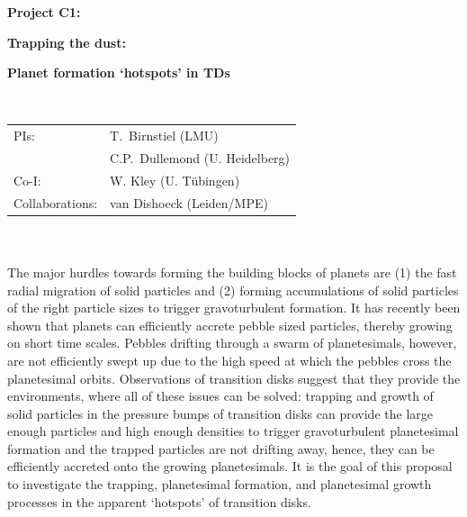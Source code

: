 \documentclass[10pt,fleqn,twoside]{article}
\begin{document}
\newpage


\setcounter{page}{1}

\centerline{\huge\bf\Tcol
%
%
%
%
%
 Project C1:}
\vspace{1em}

\centerline{\LARGE\bf\Tcol Trapping the dust:}\vspace{0.3em}
\centerline{\LARGE\bf\Tcol  Planet formation `hotspots' in TDs}

%
%
%
%
%
\vskip1.0cm


\\
\begin{tabular}{ll}
{\textsf{PIs:}}            & T.~Birnstiel (LMU) \\
                           & C.P.~Dullemond (U. Heidelberg)\\
{\textsf{Co-I:}}           & W. Kley (U. Tübingen) \\
{\textsf{Collaborations:}} & van Dishoeck (Leiden/MPE) \\

\end{tabular}


\vspace{1em}
 \\

\vspace{1em}
\\
The major hurdles towards forming the building blocks of planets are
(1) the fast radial migration of solid particles and (2) forming
accumulations of solid particles of the right particle sizes to
trigger gravoturbulent formation. It has recently been shown that
planets can efficiently accrete pebble sized particles, thereby
growing on short time scales. Pebbles drifting through a swarm of
planetesimals, however, are not efficiently swept up due to the high
speed at which the pebbles cross the planetesimal orbits. Observations
of transition disks suggest that they provide the environments,
where all of these issues can be solved: trapping and growth of solid
particles in the pressure bumps of transition disks can provide
the large enough particles and high enough densities to trigger
gravoturbulent planetesimal formation and the trapped particles are
not drifting away, hence, they can be efficiently accreted onto the
growing planetesimals. It is the goal of this proposal to investigate
the trapping, planetesimal formation, and planetesimal growth
processes in the apparent `hotspots' of transition disks.
\end{document}
